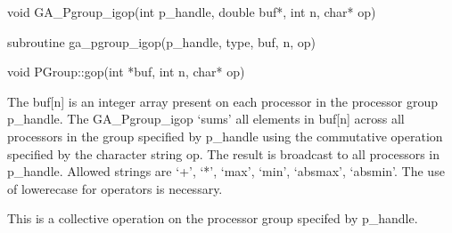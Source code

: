 \documentclass[12pt]{article}
\begin{document}

\begin{capi}
\begin{ccode}
void GA_Pgroup_igop(int p_handle, double buf*, int n, char* op)
\end{ccode}
\begin{funcargs}
\end{funcargs}
\end{capi}

\begin{fapi}
\begin{fcode}
subroutine ga_pgroup_igop(p_handle, type, buf, n, op)
\end{fcode}
\begin{funcargs}
\end{funcargs}
\end{fapi}

\begin{cxxapi}
\begin{cxxcode}
void PGroup::gop(int *buf, int n, char* op)
\end{cxxcode}
\begin{funcargs}
\end{funcargs}
\end{cxxapi}
\gcoll
\begin{desc}

The buf[n] is an integer array present on each processor in the processor group p_handle. The GA_Pgroup_igop `sums' all elements in buf[n] across all processors in the group specified by p_handle using the commutative operation specified by the character string op.  The result is broadcast to all processors in p_handle. Allowed strings are `+', `*', `max', `min', `absmax', `absmin'. The use of lowerecase for operators is necessary.

This is a collective operation on the processor group specifed by p_handle. 
\end{desc}
\end{document}
